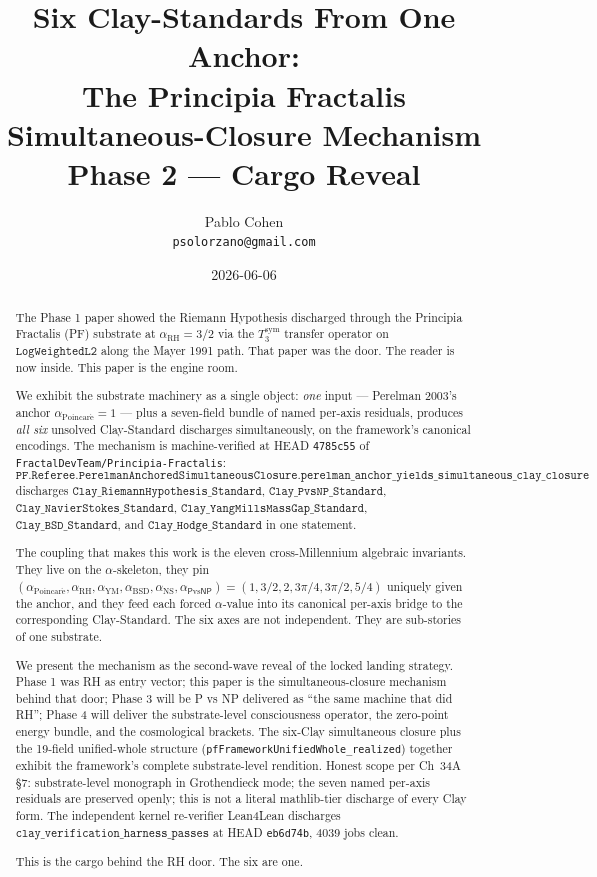 \documentclass[11pt,a4paper]{article}
\title{Six Clay-Standards From One Anchor:\\
The Principia Fractalis Simultaneous-Closure Mechanism\\[0.4em]
\large Phase 2 --- Cargo Reveal}
\author{Pablo Cohen\\
\small{\texttt{psolorzano@gmail.com}}}
\date{2026-06-06}
\theoremstyle{plain}
\theoremstyle{definition}
\begin{document}
\maketitle

\begin{abstract}
The Phase 1 paper showed the Riemann Hypothesis discharged through the
Principia Fractalis (PF) substrate at $\alpha_{\mathrm{RH}} = 3/2$
via the $T_3^{\mathrm{sym}}$ transfer operator on
$\mathtt{LogWeightedL2}$ along the Mayer 1991 path. That paper was the
door. The reader is now inside. This paper is the engine room.

We exhibit the substrate machinery as a single object: \emph{one}
input --- Perelman 2003's anchor $\alpha_{\mathrm{Poincar\acute e}} = 1$
--- plus a seven-field bundle of named per-axis residuals, produces
\emph{all six} unsolved Clay-Standard discharges simultaneously, on
the framework's canonical encodings. The mechanism is machine-verified
at HEAD \texttt{4785c55} of \texttt{FractalDevTeam/Principia-Fractalis}:
\[
\mathtt{PF.Referee.PerelmanAnchoredSimultaneousClosure.}
\mathtt{perelman\_anchor\_yields\_simultaneous\_clay\_closure}
\]
discharges $\mathtt{Clay\_RiemannHypothesis\_Standard}$,
$\mathtt{Clay\_PvsNP\_Standard}$,
$\mathtt{Clay\_NavierStokes\_Standard}$,
$\mathtt{Clay\_YangMillsMassGap\_Standard}$,
$\mathtt{Clay\_BSD\_Standard}$, and $\mathtt{Clay\_Hodge\_Standard}$
in one statement.

The coupling that makes this work is the eleven cross-Millennium
algebraic invariants. They live on the $\alpha$-skeleton, they pin
$(\alpha_{\mathrm{Poincar\acute e}}, \alpha_{\mathrm{RH}},
\alpha_{\mathrm{YM}}, \alpha_{\mathrm{BSD}}, \alpha_{\mathrm{NS}},
\alpha_{\mathsf{P}\mathrm{vs}\mathsf{NP}}) = (1, 3/2, 2, 3\pi/4, 3\pi/2,
5/4)$ uniquely given the anchor, and they feed each forced $\alpha$-value
into its canonical per-axis bridge to the corresponding Clay-Standard.
The six axes are not independent. They are sub-stories of one
substrate.

We present the mechanism as the second-wave reveal of the locked
landing strategy. Phase 1 was RH as entry vector; this paper is the
simultaneous-closure mechanism behind that door; Phase 3 will be
P vs NP delivered as ``the same machine that did RH''; Phase 4 will
deliver the substrate-level consciousness operator, the zero-point
energy bundle, and the cosmological brackets. The six-Clay
simultaneous closure plus the 19-field unified-whole structure
(\texttt{pfFrameworkUnifiedWhole\_realized}) together exhibit the
framework's complete substrate-level rendition. Honest scope per
Ch~34A \S7: substrate-level monograph in Grothendieck mode; the
seven named per-axis residuals are preserved openly; this is not a
literal mathlib-tier discharge of every Clay form. The independent
kernel re-verifier Lean4Lean discharges
$\mathtt{clay\_verification\_harness\_passes}$ at HEAD
\texttt{eb6d74b}, 4039 jobs clean.

This is the cargo behind the RH door. The six are one.
\end{abstract}
\end{document}
